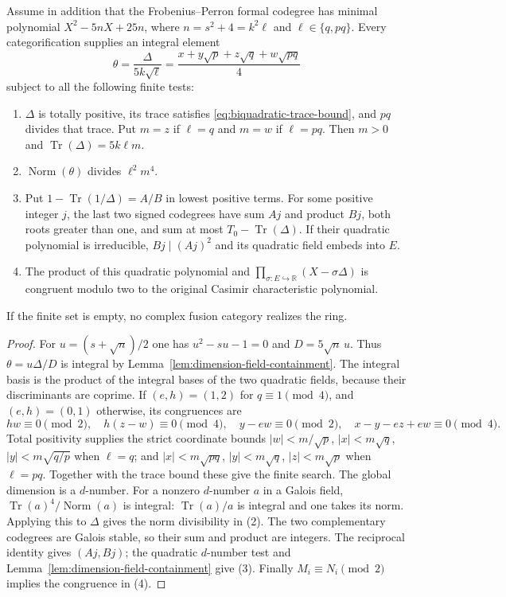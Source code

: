 \begin{proposition}
\label{prop:biquadratic-trace-obstruction}
Assume in addition that the Frobenius--Perron formal codegree has minimal
polynomial $X^2-5nX+25n$, where $n=s^2+4=k^2\ell$ and
$\ell\in\{q,pq\}$.  Every categorification supplies an integral element
\[
\theta=\frac{\Delta}{5k\sqrt\ell}
=\frac{x+y\sqrt p+z\sqrt q+w\sqrt{pq}}4
\]
subject to all the following finite tests:
\begin{enumerate}
\item $\Delta$ is totally positive, its trace satisfies
\eqref{eq:biquadratic-trace-bound}, and $pq$ divides that trace.
Put $m=z$ if $\ell=q$ and $m=w$ if $\ell=pq$.  Then $m>0$ and
$\operatorname{Tr}(\Delta)=5k\ell m$.
\item $\operatorname{Norm}(\theta)$ divides $\ell^2m^4$.
\item Put $1-\operatorname{Tr}(1/\Delta)=A/B$ in lowest positive terms.
For some positive integer $j$, the last two signed codegrees have sum $Aj$
and product $Bj$, both roots greater than one, and sum at most
$T_0-\operatorname{Tr}(\Delta)$.  If their quadratic polynomial is
irreducible, $Bj\mid(Aj)^2$ and its quadratic field embeds into $E$.
\item The product of this quadratic polynomial and
$\prod_{\sigma:E\hookrightarrow\mathbb R}(X-\sigma\Delta)$ is congruent
modulo two to the original Casimir characteristic polynomial.
\end{enumerate}
If the finite set is empty, no complex fusion category realizes the ring.
\end{proposition}
\begin{proof}
For $u=(s+\sqrt n)/2$ one has $u^2-su-1=0$ and
$D=5\sqrt n\,u$.  Thus $\theta=u\Delta/D$ is integral by
Lemma~\ref{lem:dimension-field-containment}.
The integral basis is the product of the integral bases of the two quadratic
fields, because their discriminants are coprime.  If $(e,h)=(1,2)$ for
$q\equiv1\pmod4$, and $(e,h)=(0,1)$ otherwise, its congruences are
\[
hw\equiv0\pmod2,\quad h(z-w)\equiv0\pmod4,\quad
y-ew\equiv0\pmod2,\quad x-y-ez+ew\equiv0\pmod4.
\]
Total positivity supplies the strict coordinate bounds
$|w|<m/\sqrt p$, $|x|<m\sqrt q$, $|y|<m\sqrt{q/p}$ when $\ell=q$;
and $|x|<m\sqrt{pq}$, $|y|<m\sqrt q$, $|z|<m\sqrt p$ when $\ell=pq$.
Together with the trace bound these give the finite search.
The global dimension is a $d$-number.  For a nonzero $d$-number $a$ in a
Galois field, $\operatorname{Tr}(a)^4/\operatorname{Norm}(a)$ is integral:
$\operatorname{Tr}(a)/a$ is integral and one takes its norm.  Applying this
to $\Delta$ gives the norm divisibility in (2).
The two complementary codegrees are Galois stable, so their sum and product
are integers.  The reciprocal identity gives $(Aj,Bj)$; the quadratic
$d$-number test and Lemma~\ref{lem:dimension-field-containment} give (3).
Finally $M_i\equiv N_i\pmod2$ implies the congruence in (4).
\end{proof}

